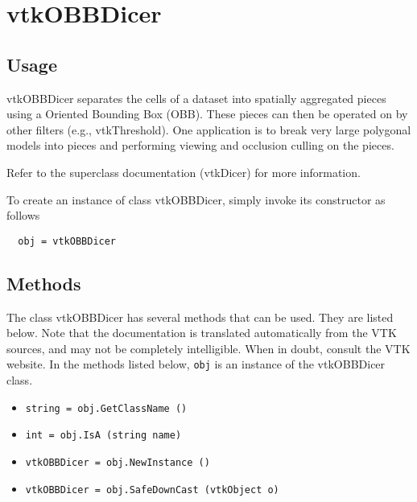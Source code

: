 \section{vtkOBBDicer}

\subsection{Usage}

 vtkOBBDicer separates the cells of a dataset into spatially
 aggregated pieces using a Oriented Bounding Box (OBB). These pieces
 can then be operated on by other filters (e.g., vtkThreshold). One
 application is to break very large polygonal models into pieces and
 performing viewing and occlusion culling on the pieces.

 Refer to the superclass documentation (vtkDicer) for more information.

To create an instance of class vtkOBBDicer, simply
invoke its constructor as follows
\begin{verbatim}
  obj = vtkOBBDicer
\end{verbatim}
\subsection{Methods}

The class vtkOBBDicer has several methods that can be used.
  They are listed below.
Note that the documentation is translated automatically from the VTK sources,
and may not be completely intelligible.  When in doubt, consult the VTK website.
In the methods listed below, \verb|obj| is an instance of the vtkOBBDicer class.
\begin{itemize}
\item  \verb|string = obj.GetClassName ()|

\item  \verb|int = obj.IsA (string name)|

\item  \verb|vtkOBBDicer = obj.NewInstance ()|

\item  \verb|vtkOBBDicer = obj.SafeDownCast (vtkObject o)|

\end{itemize}
